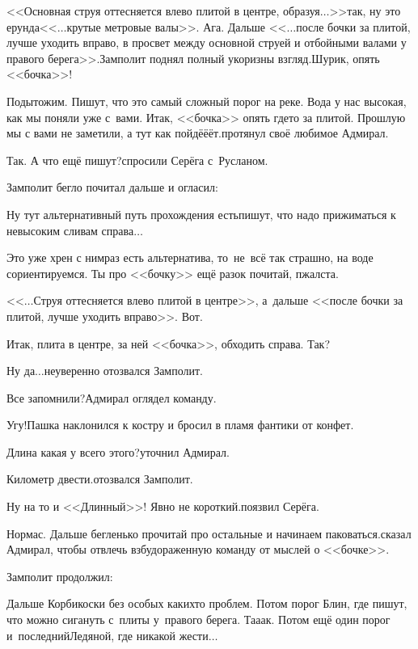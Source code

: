 \diagdash <<Основная струя оттесняется влево плитой в центре, образуя$\ldots$>>\mdash так, ну это ерунда\mdash <<$\ldots$крутые метровые валы>>. Ага. Дальше <<$\ldots$после бочки за плитой, лучше уходить вправо, в просвет между основной струей и отбойными валами у правого берега>>.\mdash Замполит поднял полный укоризны взгляд.\mdash Шурик, опять <<бочка>>!

\diagdash Подытожим. Пишут, что это самый сложный порог на реке. Вода у нас высокая, как мы поняли уже с~вами. Итак, <<бочка>> опять где\sdash то за плитой. Прошлую мы с вами не заметили, а тут как пойдё\sdash ё\sdash ёт.\mdash протянул своё любимое Адмирал.

\diagdash Так. А что ещё пишут?\mdash спросили Серёга с~Русланом.

Замполит бегло почитал дальше и огласил:

\diagdash Ну тут альтернативный путь прохождения есть\mdash пишут, что надо прижиматься к невысоким сливам справа$\ldots$

\diagdash Это уже хрен с ним\mdash раз есть альтернатива, то~не~всё так страшно, на воде сориентируемся. Ты про <<бочку>> ещё разок почитай, п\sdash жалста.

\diagdash <<$\ldots$Струя оттесняется влево плитой в центре>>, а~дальше <<после бочки за плитой, лучше уходить вправо>>. Вот.

\diagdash Итак, плита в центре, за ней <<бочка>>, обходить справа. Так?

\diagdash Ну да$\ldots$\mdash неуверенно отозвался Замполит.

\diagdash Все запомнили?\mdash Адмирал оглядел команду.

\diagdash Угу!\mdash Пашка наклонился к костру и бросил в пламя фантики от конфет.

\diagdash Длина какая у всего этого?\mdash уточнил Адмирал.

\diagdash Километр двести.\mdash отозвался Замполит.

\diagdash Ну на то и <<Длинный>>! Явно не короткий.\mdash поязвил Серёга.

\diagdash Нормас. Дальше бегленько прочитай про остальные и начинаем паковаться.\mdash сказал Адмирал, чтобы отвлечь взбудораженную команду от мыслей о <<бочке>>.

Замполит продолжил:

\diagdash Дальше Корбикоски без особых каких\sdash то проблем. Потом порог Блин, где пишут, что можно сигануть с~плиты у~правого берега. Та\sdash а\sdash ак. Потом ещё один порог и~последний\mdash Ледяной, где никакой жести$\ldots$

